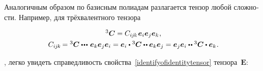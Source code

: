 \begin{otherlanguage}{russian}
Аналогичным образом по базисным полиадам разлагается тензор любой сложности. Например, для трёхвалентного тензора

\nopagebreak\begin{equation}\label{polyada:3}
\begin{array}{c}
{^3\!\,\bm{C}} = C_{i\hspace{-0.1ex}j\hspace{-0.1ex}k} \hspace{.2ex} \bm{e}_i \bm{e}_j \bm{e}_k \hspace{.1ex},
\\[.8ex]
C_{i\hspace{-0.1ex}j\hspace{-0.1ex}k} \hspace{-0.2ex} = {^3\!\,\bm{C}} \dotdotdotp \bm{e}_k \bm{e}_j \bm{e}_i = \bm{e}_i \dotp {^3\!\,\bm{C}} \dotdotp \bm{e}_k \bm{e}_j = \bm{e}_j \bm{e}_i \dotdotp {^3\!\,\bm{C}} \dotp \bm{e}_k \hspace{.1ex}.
\end{array}
\end{equation}

 , легко увидеть справедливость свойства~\eqref{identifyofidentitytensor}  тензора~$\bm{E}$:


\end{otherlanguage}
